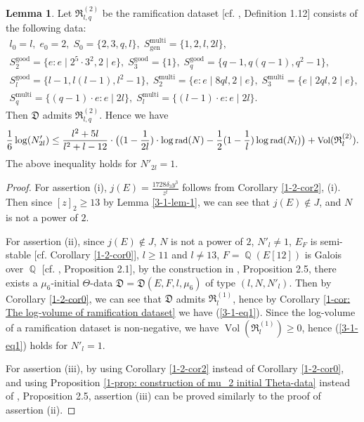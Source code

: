 \documentclass[a4paper, 12pt]{article}
\DeclareMathOperator{\Q}{\mathbb{Q}}
\DeclareMathOperator{\rad}{\text{rad}}
\DeclareMathOperator{\good}{\text{good}}
\DeclareMathOperator{\multi}{\text{multi}}
\DeclareMathOperator{\gen}{\text{gen}}
\DeclareMathOperator{\Vol}{\text{Vol}}
\numberwithin{equation}{section}
\theoremstyle{definition}
\newtheorem{lem}[thm]{Lemma}
\begin{document}
\begin{lem}
Let $\mathfrak{R}_{l,q}^{(2)}$ be the ramification dataset [cf. \cite{Diophantine_after_IUT_I}, Definition 1.12] consists of the following data:
\begin{gather*}
l_0 = l, \;  e_0 = 2, \; S_0=\{2,3,q,l\}, \; S_{\gen}^{\multi} = \{1,2,l,2l\}, \\
S_2^{\good} = \{e: e\mid 2^5\cdot 3^2, 2\mid e\}, \;
S_3^{\good} = \{1\}, \;
S_q^{\good} = \{q-1, q(q-1), q^2-1\}, \\
S_l^{\good} = \{l-1, l(l-1), l^2-1\}, \;
S_2^{\multi} = \{e: e\mid 8ql, 2\mid e\}, \; S_3^{\multi} = \{e\mid 2ql, 2\mid e\}, \\
S_q^{\multi} = \{(q-1)\cdot e: e\mid 2l\}, \; S_l^{\multi} = \{(l-1)\cdot e: e\mid 2l\} .
\end{gather*}
Then $\mathfrak D$ admits $\mathfrak R_{l,q}^{(2)}$.
Hence we have 
\begin{equation} \small \label{3-1-eq2}
    \frac{1}{6}\log(N'_{2l}) \le  \frac{l^2+5l}{l^2+l-12}\cdot \big( (1-\frac{1}{2  l})\cdot \log\rad(N) - \frac{1}{2}(1- \frac{1}{l}) \log\rad(N_l)  \big) + \Vol(\mathfrak R_l^{(2)}).
\end{equation}
The above inequality holds for $N'_{2l} = 1$.

\end{lem}
\begin{proof}
For assertion (i), $j(E) = \frac{ 1728\delta_3 y^3 }{ z^t }$ follows from Corollary \ref{1-2-cor2}, (i). Then since $[z]_2 \ge 13$ by Lemma \ref{3-1-lem-1}, we can see that $j(E) \not\in J$, and $N$ is not a power of $2$.

For assertion (ii), since $j(E) \notin J$, $N$ is not a power of $2$, $N'_l \neq 1$, $E_F$ is semi-stable [cf. Corollary \ref{1-2-cor0}], $l\ge 11$ and $l\neq 13$, $F = \Q(E[12])$ is Galois over $\Q$ [cf. \cite{Diophantine_after_IUT_I}, Proposition 2.1],
by the construction in \cite{Diophantine_after_IUT_I}, Proposition 2.5, there exists a $\mu_6$-initial $\Theta$-data $\mathfrak D = \mathfrak D(E,F,l,\mu_6)$ of type $(l, N, N'_l)$. Then by Corollary \ref{1-2-cor0}, we can see that $\mathfrak D$ admits $\mathfrak R_l^{(1)}$, hence by Corollary \ref{1-cor: The log-volume of ramification dataset} we have (\ref{3-1-eq1}). Since the log-volume of a ramification dataset is non-negative, we have $\Vol(\mathfrak R_l^{(1)}) \ge 0$, hence  (\ref{3-1-eq1}) holds for $N'_l = 1$.

For assertion (iii), by using Corollary \ref{1-2-cor2} instead of Corollary \ref{1-2-cor0}, and using Proposition \ref{1-prop: construction of mu_2 initial Theta-data} instead of \cite{Diophantine_after_IUT_I}, Proposition 2.5,
assertion (iii) can be proved similarly to the proof of assertion (ii).

\end{proof}
\end{document}
